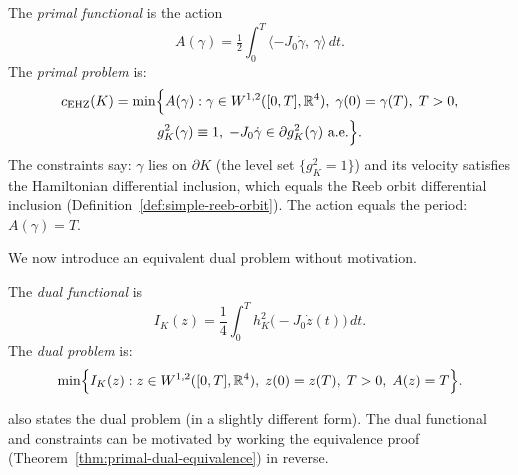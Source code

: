 \begin{definition}\label{def:primal-problem}
The \emph{primal functional} is the action
\[
  A(\gamma) = \tfrac{1}{2}\int_0^T
  \langle -J_0\dot{\gamma},\, \gamma \rangle\, dt.
\]
The \emph{primal problem} is:
\begin{multline}\label{eq:primal-problem}
  c_{\mathrm{EHZ}}(K) = \min \Bigl\{ A(\gamma) :
  \gamma \in W^{1,2}([0,T], \mathbb{R}^4),\;
  \gamma(0) = \gamma(T),\;
  T > 0, \\
  g_K^2(\gamma) \equiv 1,\;
  -J_0\dot{\gamma} \in \partial g_K^2(\gamma) \text{ a.e.} \Bigr\}.
\end{multline}
The constraints say: $\gamma$ lies on $\partial K$
(the level set $\{g_K^2 = 1\}$) and its velocity satisfies the
Hamiltonian differential inclusion, which equals the Reeb orbit
differential inclusion (Definition~\ref{def:simple-reeb-orbit}).
The action equals the period: $A(\gamma) = T$.
\end{definition}

We now introduce an equivalent dual problem without motivation.

\begin{definition}\label{def:dual-problem}
The \emph{dual functional} is
\[
  I_K(z) = \frac{1}{4} \int_0^T h_K^2\bigl( -J_0 \dot{z}(t) \bigr) \, dt.
\]
The \emph{dual problem} is:
\begin{equation}\label{eq:dual-problem}
  \min \Bigl\{ I_K(z) :
  z \in W^{1,2}([0,T], \mathbb{R}^4),\;
  z(0) = z(T),\;
  T > 0,\;
  A(z) = T \Bigr\}.
\end{equation}
\end{definition}

\cite{HK2017} also states the dual problem
(in a slightly different form).
The dual functional and constraints can be motivated by working
the equivalence proof
(Theorem~\ref{thm:primal-dual-equivalence}) in reverse.

